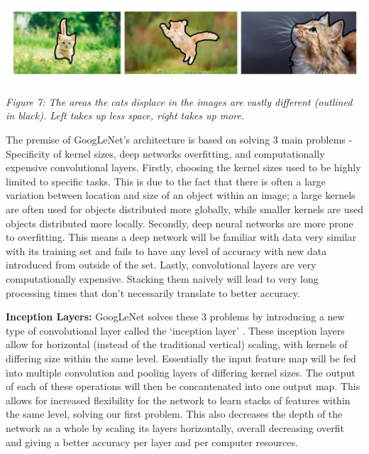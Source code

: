 \documentclass[11pt]{article}
\def\paraskip{\vskip 0.4cm}
\begin{document}
        \begin{center}
            \includegraphics[width=15cm]{images/cats.png}
            \\
            \raggedright \textit{
            Figure 7: The areas the cats displace in the images are vastly different (outlined in black). Left takes up less space, right takes up more.
            }
        \end{center}

        The premise of GoogLeNet's architecture is based on solving 3 main problems - Specificity of kernel sizes, deep networks overfitting, and computationally expensive convolutional layers. Firstly, choosing the kernel sizes used to be highly limited to specific tasks. This is due to the fact that there is often a large variation between location and size of an object within an image; a large kernels are often used for objects distributed more globally, while smaller kernels are used objects distributed more locally. Secondly, deep neural networks are more prone to overfitting. This means a deep network will be familiar with data very similar with its training set and fails to have any level of accuracy with new data introduced from outside of the set. Lastly, convolutional layers are very computationally expensive. Stacking them naively will lead to very long processing times that don't necessarily translate to better accuracy.

        \paraskip

        \noindent\textbf{Inception Layers: } GoogLeNet solves these 3 problems by introducing a new type of convolutional layer called the `inception layer' \cite{inception}. These inception layers allow for horizontal (instead of the traditional vertical) scaling, with kernels of differing size within the same level. Essentially the input feature map will be fed into multiple convolution and pooling layers of differing kernel sizes. The output of each of these operations will then be concantenated into one output map. This allows for increased flexibility for the network to learn stacks of features within the same level, solving our first problem. This also decreases the depth of the network as a whole by scaling its layers horizontally, overall decreasing overfit and giving a better accuracy per layer and per computer resources.
\end{document}

